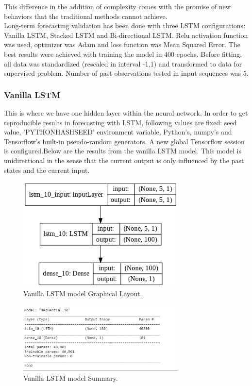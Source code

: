 \documentclass[12pt]{report}
\begin{document}
This difference in the addition of complexity comes with the promise of new behaviors that the traditional methods cannot achieve.\\
Long-term forecasting validation has been done with three LSTM configurations: Vanilla LSTM, Stacked LSTM and Bi-directional LSTM. Relu activation function was used, optimizer was Adam and loss function was Mean Squared Error. The best results were achieved with training the model in 400 epochs. Before fitting, all data was standardized (rescaled in interval -1,1) and transformed to data for supervised problem.
Number of past observations tested in input sequences was 5.

\subsubsection{Vanilla LSTM}
This is where we have one hidden layer within the neural network.
In order to get reproducible results in forecasting with LSTM, following values are fixed: seed value, 'PYTHONHASHSEED' environment variable, Python's, numpy's and Tensorflow's built-in pseudo-random generators. A new global Tensorflow session is configured.Below are the results from the vanilla LSTM model.
This model is unidirectional in the sense that the current output is only influenced by the past states and the current input.
\begin{figure}[H]%
  \begin {center}
  \includegraphics[width=0.75\textwidth]{dia.png}
  \caption{Vanilla LSTM model Graphical Layout.}
  \label{fig:ecg}
  \end {center}
\end{figure}

\begin{figure}[H]%
  \begin {center}
  \includegraphics[width=0.75\textwidth]{VanillaSummary.png}
  \caption{Vanilla LSTM model Summary.}
  \label{fig:ecg}
  \end {center}
\end{figure}
  
\end{document}
